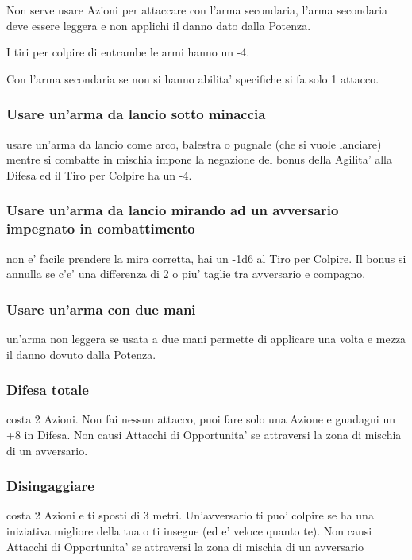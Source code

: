 \documentclass[a4paper,11pt,twoside,openany]{dndbook}
\begin{document}
Non serve usare Azioni per attaccare con l'arma secondaria, l'arma secondaria deve essere leggera e non applichi il danno dato dalla Potenza.

I tiri per colpire di entrambe le armi hanno un -4.

Con l'arma secondaria se non si hanno abilita' specifiche si fa solo 1 attacco.

\subsubsection{Usare un'arma da lancio sotto minaccia} usare un'arma da lancio come arco, balestra o pugnale (che si vuole lanciare) mentre si combatte in mischia impone la negazione del bonus della Agilita' alla Difesa ed il Tiro per Colpire ha un -4.

\subsubsection{Usare un'arma da lancio mirando ad un avversario impegnato
in combattimento} non e' facile prendere la mira corretta, hai un -1d6 al Tiro per Colpire. Il bonus si annulla se c'e' una differenza di 2 o piu' taglie tra avversario e compagno.

\subsubsection{Usare un'arma con due mani} un'arma non leggera se usata a due mani permette di applicare una volta e mezza il danno dovuto dalla Potenza.

\subsubsection{Difesa totale} costa 2 Azioni. Non fai nessun attacco, puoi fare solo una Azione e guadagni un +8 in Difesa. Non causi Attacchi di Opportunita' se attraversi la zona di mischia di un avversario.

\subsubsection{Disingaggiare} costa 2 Azioni e ti sposti di 3 metri. Un'avversario ti puo' colpire se ha una iniziativa migliore della tua o ti insegue (ed e' veloce quanto te). Non causi Attacchi di Opportunita' se attraversi la zona di mischia di un avversario
\end{document}
